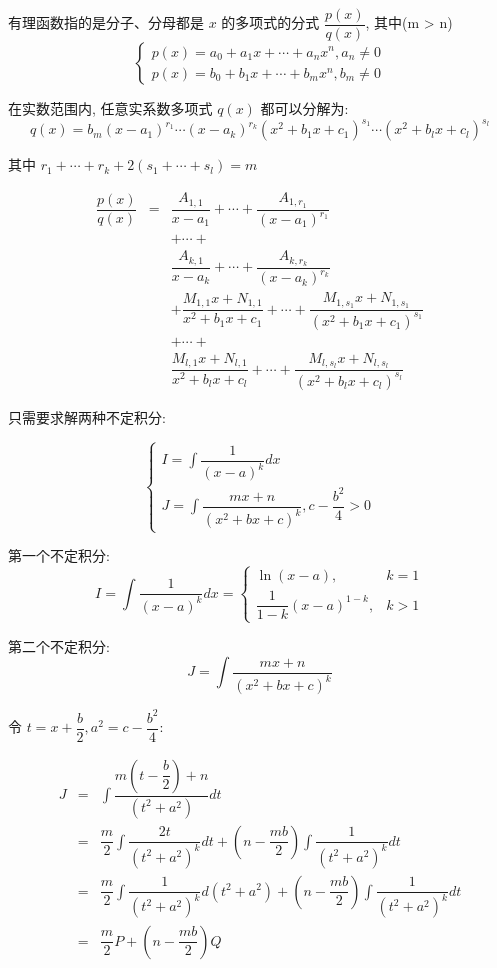 \begin{theorem}
	有理函数指的是分子、分母都是 $x$ 的多项式的分式 $\dfrac{p(x)}{q(x)}$, 其中(m > n)
	$$\begin{cases} p(x) = a_{0}+a_{1}x+\cdots+a_{n}x^{n},a_{n}\neq 0 \\ p(x) = b_{0}+b_{1}x+\cdots+b_{m}x^{n},b_{m}\neq 0  \end{cases}$$

	在实数范围内, 任意实系数多项式 $q(x)$ 都可以分解为:
	$$q(x) = b_{m}(x-a_{1})^{r_{1}}\cdots(x-a_{k})^{r_{k}}(x^{2}+b_{1}x+c_{1})^{s_{1}}\cdots(x^{2}+b_{l}x+c_{l})^{s_{l}}$$

	其中 $r_{1}+\cdots+r_{k}+ 2(s_{1}+\cdots+s_{l}) = m$

	\begin{eqnarray*}
		\dfrac{p(x)}{q(x)} &=& \dfrac{A_{1,1}}{x-a_{1}}+\cdots+\dfrac{A_{1,r_{1}}}{(x-a_{1})^{r_{1}}}\\
							& & + \cdots +\\
							& & \dfrac{A_{k,1}}{x-a_{k}}+\cdots+\dfrac{A_{k,r_{k}}}{(x-a_{k})^{r_{k}}}\\
							& & + \dfrac{M_{1,1}x+N_{1,1}}{x^{2}+b_{1}x+c_{1}}+\cdots+\dfrac{M_{1,s_{1}}x+N_{1,s_{1}}}{(x^{2}+b_{1}x+c_{1})^{s_{1}}}\\
							& & + \cdots +\\
							& & \dfrac{M_{l,1}x+N_{l,1}}{x^{2}+b_{l}x+c_{l}}+\cdots+\dfrac{M_{l,s_{l}}x+N_{l,s_{l}}}{(x^{2}+b_{l}x+c_{l})^{s_{l}}}
	\end{eqnarray*}

	只需要求解两种不定积分:

	$$\begin{cases}
		I = \int \dfrac{1}{(x-a)^{k}}dx \\
		J = \int \dfrac{mx+n}{(x^{2}+bx+c)^{k}}, c -\dfrac{b^{2}}{4} > 0
	\end{cases}$$

	第一个不定积分: 
	$$I = \int \dfrac{1}{(x-a)^{k}}dx = 
	\begin{cases}
		\ln(x-a), &k =1 \\ 
		\dfrac{1}{1-k}(x-a)^{1-k}, &k > 1 
	\end{cases}$$

	第二个不定积分: 
	$$J = \int \dfrac{mx+n}{(x^{2}+bx+c)^{k}}$$

	令 $t =x+\dfrac{b}{2}, a^{2} = c -\dfrac{b^{2}}{4}$:
	
	\begin{eqnarray*}
		J   & = & \int\dfrac{m(t-\dfrac{b}{2})+n}{(t^{2}+a^{2})}dt\\
			& = & \dfrac{m}{2}\int \dfrac{2t}{(t^{2}+a^{2})^{k}}dt + (n-\dfrac{mb}{2})\int \dfrac{1}{(t^{2}+a^{2})^{k}}dt\\
			& = & \dfrac{m}{2}\int \dfrac{1}{(t^{2}+a^{2})^{k}}d(t^{2}+a^{2}) + (n-\dfrac{mb}{2})\int \dfrac{1}{(t^{2}+a^{2})^{k}}dt\\ 
			& = & \dfrac{m}{2}P+(n-\dfrac{mb}{2})Q
	\end{eqnarray*}


\end{theorem}
